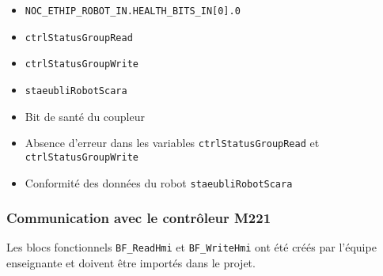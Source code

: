 \begin{UPSTIVerification}
    \begin{multicols}{2}
        \begin{itemize}
            \item \texttt{NOC\_ETHIP\_ROBOT\_IN.HEALTH\_BITS\_IN[0].0}
            \item \texttt{ctrlStatusGroupRead}
            \item \texttt{ctrlStatusGroupWrite}
            \item \texttt{staeubliRobotScara}
        \end{itemize}
    \end{multicols}
    
    \begin{itemize}[label=$\square$]
        \item Bit de santé du coupleur 
        \item Absence d'erreur dans les variables \texttt{ctrlStatusGroupRead} et \texttt{ctrlStatusGroupWrite}
        \item Conformité des données du robot \texttt{staeubliRobotScara}
    \end{itemize}
    
\end{UPSTIVerification}

\subsubsection{Communication avec le contrôleur M221}

Les blocs fonctionnels \texttt{BF\_ReadHmi} et \texttt{BF\_WriteHmi} ont été créés par l'équipe enseignante et doivent être importés dans le projet.

\begin{UPSTIManipulation}
\end{UPSTIManipulation}

